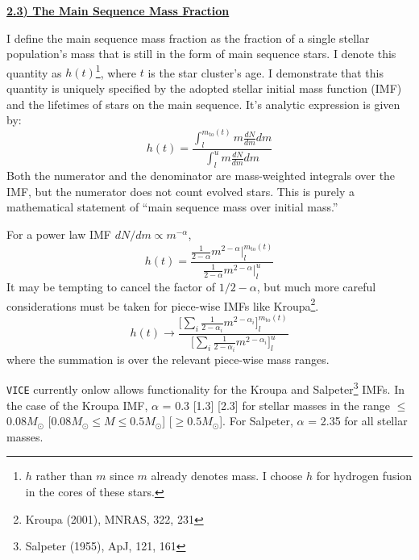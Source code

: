 \documentclass{report}
\newcommand\ddfrac[2]{\frac{\displaystyle #1}{\displaystyle #2}}
\begin{document}
\newpage 
\noindent
\begin{center} 
\hypertarget{ssp:msmf}{
	\underline{\LARGE
		\textbf{2.3) The Main Sequence Mass Fraction}
	}
}
\end{center}
\par\noindent 
I define the main sequence mass fraction as the fraction of a single 
stellar population's mass that is still in the form of main sequence stars. 
I denote this quantity as $h(t)$\footnote{
	$h$ rather than $m$ since $m$ already denotes mass. I choose $h$ for 
	hydrogen fusion in the cores of these stars. 
}, where $t$ is the star cluster's age. I demonstrate that this quantity is 
uniquely specified by the adopted stellar initial mass function (IMF) and 
the lifetimes of stars on the main sequence. It's analytic expression is given 
by: 
\begin{equation}
h(t) = \ddfrac{
	\int_l^{m_\text{to}(t)} m\frac{dN}{dm}dm 
}{
	\int_l^u m\frac{dN}{dm}dm
}
\end{equation}
Both the numerator and the denominator are mass-weighted integrals over the 
IMF, but the numerator does not count evolved stars. This is purely a 
mathematical statement of ``main sequence mass over initial mass.'' 
\par 
For a power law IMF $dN/dm \propto m^{-\alpha}$, 
\begin{equation}
h(t) = \ddfrac{
	\frac{1}{2 - \alpha}m^{2 - \alpha}\Big|_l^{m_\text{to}(t)}
}{
	\frac{1}{2 - \alpha}m^{2 - \alpha}\Big|_l^u
}
\end{equation}
It may be tempting to cancel the factor of $1/2 - \alpha$, but much more 
careful considerations must be taken for piece-wise IMFs like Kroupa\footnote{
	Kroupa (2001), MNRAS, 322, 231 
}. 
\begin{equation}
h(t) \rightarrow \ddfrac{
	\Big[\sum_i\frac{1}{2 - \alpha_i} m^{2 - \alpha_i}\Big]_l^{m_\text{to}(t)}
}{
	\Big[\sum_i\frac{1}{2 - \alpha_i} m^{2 - \alpha_i}\Big]_l^u 
}
\end{equation}
where the summation is over the relevant piece-wise mass ranges. 
\par
\texttt{VICE} currently onlow allows functionality for the Kroupa and 
Salpeter\footnote{
	Salpeter (1955), ApJ, 121, 161
} IMFs. In the case of the Kroupa IMF, $\alpha$ = 0.3 [1.3] [2.3] for stellar 
masses in the range $\leq$ 0.08$M_\odot$ [$0.08M_\odot \leq M \leq 0.5M_\odot$] 
[$\geq 0.5M_\odot$]. For Salpeter, $\alpha$ = 2.35 for all stellar masses. 
\end{document}
